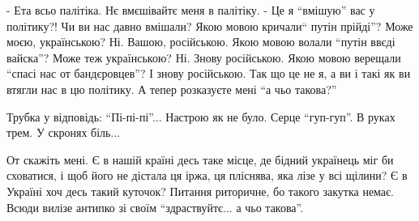 - Ета всьо палітіка. Нє вмєшівайтє меня в палітіку.
- Це я \enquote{вмішую} вас у політику?! Чи ви нас давно вмішали? Якою мовою кричали\enquote{ путін прійді}? Може моєю, українською? Ні. Вашою, російською. Якою мовою волали \enquote{путін ввєді вайска}? Може теж українською? Ні.  Знову російською. Якою мовою верещали \enquote{спасі нас от бандєровцев}? І знову російською. Так що це не я, а ви і такі як ви втягли нас в цю політику. А тепер розказуєте мені \enquote{а чьо такова?}

Трубка у відповідь: \enquote{Пі-пі-пі}...
Настрою як не було. Серце \enquote{гуп-гуп}. В руках трем. У скронях біль...

От скажіть мені. Є в нашій країні десь таке місце, де бідний українець міг би
сховатися, і щоб його не дістала ця іржа, ця пліснява, яка лізе у всі щілини? Є
в Україні хоч десь такий куточок? Питання риторичне, бо такого закутка немає.
Всюди вилізе антипко зі своїм \enquote{здраствуйтє... а чьо такова}.

\restorecr
